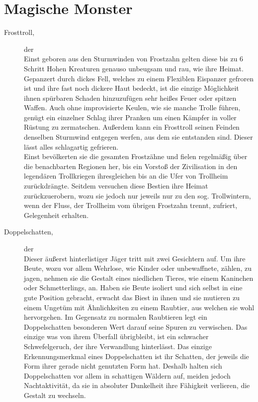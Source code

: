 \documentclass[a4paper,12pt,oneside]{book}
\begin{document}
\begin{description}
\end{description}

\chapter{Magische Monster}

\begin{description}

\item[Frosttroll,]der
\\Einst geboren aus den Sturmwinden von Frostzahn gelten diese bis zu 6 Schritt Hohen Kreaturen genauso unbeugsam und rau, wie ihre Heimat. Gepanzert durch dickes Fell, welches zu einem Flexiblen Eispanzer gefroren ist und ihre fast noch dickere Haut bedeckt, ist die einzige Möglichkeit ihnen spürbaren Schaden hinzuzufügen sehr heißes Feuer oder spitzen Waffen. Auch ohne improvisierte Keulen, wie sie manche Trolle führen, genügt ein einzelner Schlag ihrer Pranken um einen Kämpfer in voller Rüstung zu zermatschen. Außerdem kann ein Frosttroll seinen Feinden denselben Sturmwind entgegen werfen, aus dem sie entstanden sind. Dieser lässt alles schlagartig gefrieren.
\\Einst bevölkerten sie die gesamten Frostzähne und fielen regelmäßig über die benachbarten Regionen her, bis ein Vorstoß der Zivilisation in den legendären Trollkriegen ihresgleichen bis an die Ufer von Trollheim zurückdrängte. Seitdem versuchen diese Bestien ihre Heimat zurückzuerobern, wozu sie jedoch nur jeweils nur zu den sog. Trollwintern, wenn der Fluss, der Trollheim vom übrigen Frostzahn trennt, zufriert, Gelegenheit erhalten.

\item[Doppelschatten,] der
\\Dieser äußerst hinterlistiger Jäger tritt mit zwei Gesichtern auf. Um ihre Beute, wozu vor allem Wehrlose, wie Kinder oder unbewaffnete, zählen, zu jagen, nehmen sie die Gestalt eines niedlichen Tieres, wie einem Kaninchen oder Schmetterlings, an. Haben sie Beute isoliert und sich selbst in eine gute Position gebracht, erwacht das Biest in ihnen und sie mutieren zu einem Ungetüm mit Ähnlichkeiten zu einem Raubtier, aus welchen sie wohl hervorgehen. Im Gegensatz zu normalen Raubtieren legt ein Doppelschatten besonderen Wert darauf seine Spuren zu verwischen. Das einzige was von ihrem Überfall übrigbleibt, ist ein schwacher Schwefelgeruch, der ihre Verwandlung hinterlässt. Das einzige Erkennungsmerkmal eines Doppelschatten ist ihr Schatten, der jeweils die Form ihrer gerade nicht genutzten Form hat. Deshalb halten sich Doppelschatten vor allem in schattigen Wäldern auf, meiden jedoch Nachtaktivität, da sie in absoluter Dunkelheit ihre Fähigkeit verlieren, die Gestalt zu wechseln.


\end{description}
\end{document}
